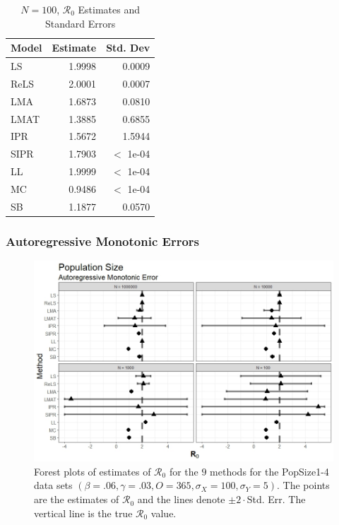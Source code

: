 \documentclass[12pt]{article}
\newcommand{\xxsir}{\ensuremath{9} } %
\newcommand{\rr}{\ensuremath{\mathcal{R}_0}}
\begin{document}
\begin{table}[H]
	
	\centering
	\begin{tabular}[t]{l|r|r}
		\hline
		Model & Estimate & Std. Dev\\
		\hline
		LS & 1.9998 & 0.0009\\
		\hline
		ReLS & 2.0001 & 0.0007\\
		\hline
		LMA & 1.6873 & 0.0810\\
		\hline
		LMAT & 1.3885 & 0.6855\\
		\hline
		IPR & 1.5672 & 1.5944\\
		\hline
		SIPR & 1.7903 & $<$ 1e-04\\
		\hline
		LL & 1.9999 & $<$ 1e-04\\
		\hline
		MC & 0.9486 & $<$ 1e-04\\
		\hline
		SB & 1.1877 & 0.0570\\
		\hline
	\end{tabular}
	\caption{$N = 100$, $\rr$ Estimates and Standard Errors}
\end{table}

\subsubsection{Autoregressive Monotonic Errors}

\begin{figure}[H]
	\centering
	\includegraphics[scale=0.5]{images/popsize_arm.jpeg}
	\caption{Forest plots of estimates of $\rr$ for the \xxsir methods for the PopSize1-4 data sets $(\beta=.06, \gamma=.03, O=365, \sigma_X=100, \sigma_Y=5)$.  The points are the estimates of $\rr$ and the lines denote $\pm 2\cdot $Std. Err.  The vertical line is the true $\rr$ value.}
\end{figure}
\end{document}
